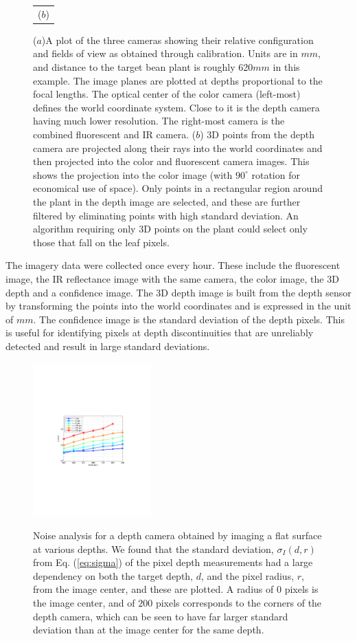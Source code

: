 \begin{figure}
\begin{tabular}{c}
  ($b$)\\
\end{tabular}
\caption{($a$)A plot of the three cameras showing their relative configuration and fields of view as obtained through calibration.  Units are in $mm$, and distance to the target bean plant is roughly 620$mm$ in this example.  The image planes are plotted at depths proportional to the focal lengths.  The optical center of the color camera (left-most) defines the world coordinate system.  Close to it is the depth camera having much lower resolution.  The right-most camera is the combined fluorescent and IR camera. ($b$) $3$D points from the depth camera are projected along their rays into the world coordinates and then projected into the color and fluorescent camera images.  This shows the projection into the color image (with $90^{\circ}$ rotation for economical use of space).  Only points in a rectangular region around the plant in the depth image are selected, and these are further filtered by eliminating points with high standard deviation.  An algorithm requiring only $3$D points on the plant could select only those that fall on the leaf pixels.}
\label{fig:CameraConfiguration}
\end{figure}

The imagery data were collected once every hour.
These include the fluorescent image, the IR reflectance image with the same camera, the color image, the $3$D depth and a confidence image.
The $3$D depth image is built from the depth sensor by transforming the points into the world coordinates and is expressed in the unit of $mm$.
The confidence image is the standard deviation of the depth pixels.
This is useful for identifying pixels at depth discontinuities that are unreliably detected and result in large standard deviations.


\begin{figure}
\centering
  \includegraphics[height=5.9cm,trim=110 250 60 260,clip]{Figures/SigmaRadius} \\
\caption{Noise analysis for a depth camera obtained by imaging a flat surface at various depths.  We found that the standard deviation, $\sigma_I(d,r)$ from Eq. (\ref{eq:sigma}) of the pixel depth measurements had a large dependency on both the target depth, $d$, and the pixel radius, $r$, from the image center, and these are plotted.  A radius of $0$ pixels is the image center, and of $200$ pixels corresponds to the corners of the depth camera, which can be seen to have far larger standard deviation than at the image center for the same depth. }
\label{fig:Noise}
\end{figure}

